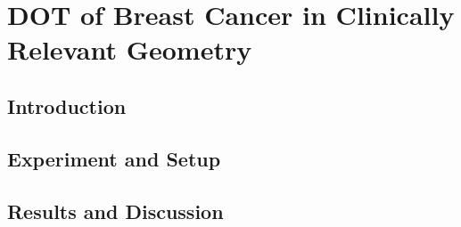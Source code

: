 \chapter{DOT of Breast Cancer in Clinically Relevant Geometry}

\section{Introduction}

\section{Experiment and Setup}

\section{Results and Discussion}